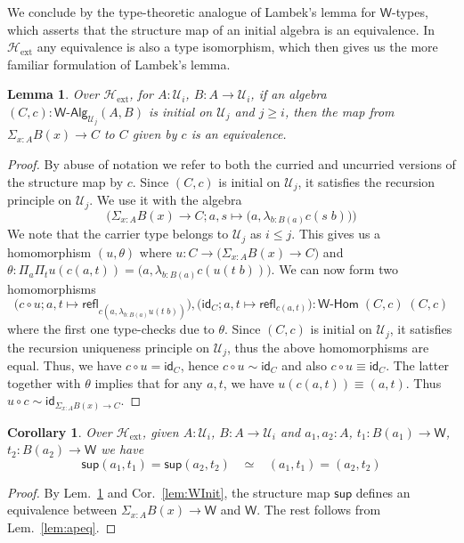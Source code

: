 \documentclass[reqno,10pt,a4paper,oneside]{amsart}
\newcommand{\comp}{\circ}
\newcommand{\idfun}[1]{\mathsf{id}_{#1}}
\newcommand{\prd}[1]{\Pi_{#1}}
\newcommand{\sm}[1]{\Sigma_{#1}}
\newcommand{\lam}[1]{\lambda_{#1}}
\newcommand{\refl}{\mathsf{refl}}
\newcommand{\W}{\mathsf{W}}
\newcommand{\wsup}{\mathsf{sup}}
\newcommand{\UU}{\mathcal{U}}
\newcommand{\WAlg}{\mathsf{W}\text{-}\mathsf{Alg}}
\newcommand{\WHom}{\mathsf{W}\text{-}\mathsf{Hom}}
\newcommand{\Hext}{\mathcal{H}_{\mathrm{ext}}}
\numberwithin{equation}{section}
\theoremstyle{mythm}
\newtheorem{lemma}[theorem]{Lemma}
\newtheorem{corollary}[theorem]{Corollary}
\theoremstyle{mydef}
\theoremstyle{myrmk}
\begin{document}
We conclude by the type-theoretic analogue of Lambek's lemma for $\W$-types, which asserts that the structure map of an initial algebra is an equivalence. In $\Hext$ any equivalence is also a type isomorphism, which then gives us the more familiar formulation of Lambek's lemma.

\begin{lemma}\label{lem:ExtLambek}
Over $\Hext$, for $A:\UU_i$, $B : A \to \UU_i$, if an algebra $(C,c) : \WAlg_{\UU_j}(A,B)$ is initial on $\UU_j$ and $j \geq i$, then the map from $\sm{x:A} B(x) \to C$ to $C$ given by $c$ is an equivalence.
\end{lemma}
\begin{proof}
By abuse of notation we refer to both the curried and uncurried versions of the structure map by $c$. Since $(C,c)$ is initial on $\UU_j$, it satisfies the recursion principle on $\UU_j$. We use it with the algebra \[\Big(\sm{x:A} B(x) \to C; a,s \mapsto \big(a,\lam{b:B(a)} c(s\;b)\big)\Big)\]
We note that the carrier type belongs to $\UU_j$ as $i \leq j$. This gives us a homomorphism $(u,\theta)$ where $u : C \to \big(\sm{x:A} B(x) \to C\big)$ and $\theta : \prd{a}\prd{t} u(c(a,t)) = \big(a,\lam{b:B(a)} c(u(t\;b))\big)$.  We can now form two homomorphisms
\[\big(c \comp u; a,t \mapsto \refl_{c(a,\lam{b:B(a)}u(t\;b))}\big), \big(\idfun{C}; a,t \mapsto \refl_{c(a,t)}\big) : \WHom \; (C,c) \; (C,c)\] where the first one type-checks due to $\theta$. Since $(C,c)$ is initial on $\UU_j$, it satisfies the recursion uniqueness principle on $\UU_j$, thus the above homomorphisms are equal. Thus, we have $c \comp u = \idfun{C}$, hence $c \comp u \sim \idfun{C}$ and also $c \comp u \equiv \idfun{C}$. The latter together with $\theta$ implies that for any $a,t$, we have $u(c(a,t)) \equiv (a,t)$. Thus $u \comp c \sim \idfun{\sm{x:A} B(x) \to C}$.
\end{proof}

\begin{corollary}
Over $\Hext$, given $A:\UU_i$, $B : A \to \UU_i$ and $a_1,a_2:A$, $t_1 : B(a_1) \to \W$, $t_2 : B(a_2) \to \W$ we have
\[ \wsup(a_1,t_1) = \wsup(a_2,t_2) \;\;\; \simeq \;\;\; (a_1,t_1) = (a_2,t_2)\]
\end{corollary}
\begin{proof}
By Lem.~\ref{lem:ExtLambek} and Cor.~\ref{lem:WInit}, the structure map $\wsup$ defines an equivalence between $\sm{x:A} B(x) \to \W$ and $\W$. The rest follows from Lem.~\ref{lem:apeq}.
\end{proof}
\end{document}
